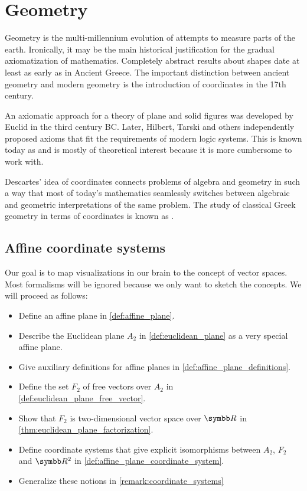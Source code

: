 \section{Geometry}\label{sec:geometry}

\begin{remark}\label{def:coordinates_in_geometry}
  Geometry is the multi-millennium evolution of attempts to measure parts of the earth. Ironically, it may be the main historical justification for the gradual axiomatization of mathematics. Completely abstract results about shapes date at least as early as in Ancient Greece. The important distinction between ancient geometry and modern geometry is the introduction of coordinates in the 17th century.

  An axiomatic approach for a theory of plane and solid figures was developed by Euclid in the third century BC. Later, Hilbert, Tarski and others independently proposed axioms that fit the requirements of modern logic systems. This is known today as  and is mostly of theoretical interest because it is more cumbersome to work with.

  Descartes' idea of coordinates connects problems of algebra and geometry in such a way that most of today's mathematics seamlessly switches between algebraic and geometric interpretations of the same problem. The study of classical Greek geometry in terms of coordinates is known as .
\end{remark}

\subsection{Affine coordinate systems}\label{subsec:affine_coordinate_system}

Our goal is to map visualizations in our brain to the concept of vector spaces. Most formalisms will be ignored because we only want to sketch the concepts. We will proceed as follows:
\begin{itemize}
  \item Define an affine plane in \cref{def:affine_plane}.
  \item Describe the Euclidean plane \( A_2 \) in \cref{def:euclidean_plane} as a very special affine plane.
  \item Give auxiliary definitions for affine planes in \cref{def:affine_plane_definitions}.
  \item Define the set \( F_2 \) of free vectors over \( A_2 \) in \cref{def:euclidean_plane_free_vector}.
  \item Show that \( F_2 \) is two-dimensional vector space over \( \R \) in \cref{thm:euclidean_plane_factorization}.
  \item Define coordinate systems that give explicit isomorphisms between \( A_2 \), \( F_2 \) and \( \R^2 \) in \cref{def:affine_plane_coordinate_system}.
  \item Generalize these notions in \cref{remark:coordinate_systems}
\end{itemize}

